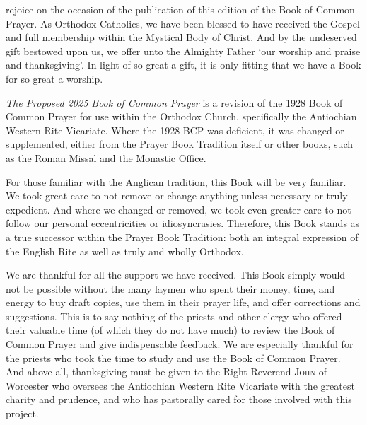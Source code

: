 {}
\noindent

 rejoice on the occasion of the publication of this edition of the Book of Common Prayer. As Orthodox Catholics, we have been blessed to have received the Gospel and full membership within the Mystical Body of Christ. And by the undeserved gift bestowed upon us, we offer unto the Almighty Father `our worship and praise and thanksgiving'. In light of so great a gift, it is only fitting that we have a Book for so great a worship.

\vspace{0.5\baselineskip}

\emph{The Proposed 2025 Book of Common Prayer} is a revision of the 1928 Book of Common Prayer for use within the Orthodox Church, specifically the Antiochian Western Rite Vicariate. Where the 1928 BCP was deficient, it was changed or supplemented, either from the Prayer Book Tradition itself or other books, such as the Roman Missal and the Monastic Office.

\vspace{0.5\baselineskip}

For those familiar with the Anglican tradition, this Book will be very familiar. We took great care to not remove or change anything unless necessary or truly expedient. And where we changed or removed, we took even greater care to not follow our personal eccentricities or idiosyncrasies. Therefore, this Book stands as a true successor within the Prayer Book Tradition: both an integral expression of the English Rite as well as truly and wholly Orthodox.

\vspace{0.5\baselineskip}


We are thankful for all the support we have received. This Book simply would not be possible without the many laymen who spent their money, time, and energy to buy draft copies, use them in their prayer life, and offer corrections and suggestions. This is to say nothing of the priests and other clergy who offered their valuable time (of which they do not have much) to review the Book of Common Prayer and give indispensable feedback. We are especially thankful for the priests who took the time to study and use the Book of Common Prayer. And above all, thanksgiving must be given to the Right Reverend \textsc{John} of Worcester who oversees the Antiochian Western Rite Vicariate with the greatest charity and prudence, and who has pastorally cared for those involved with this project.

